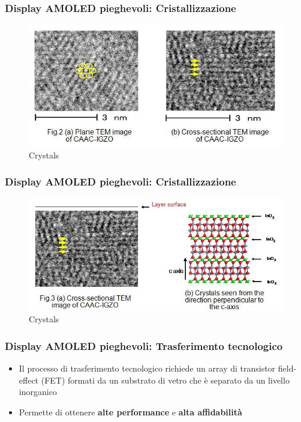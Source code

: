 \documentclass[12pt]{beamer}
\begin{document}
	\begin{frame}
		\frametitle{Display AMOLED pieghevoli: Cristallizzazione}
		\begin{figure}
			\centering
			\includegraphics[width=1\linewidth]{IMMAGINI/immagine_cristalizzazione}
			\caption{Crystals}
			\label{fig:immaginecristalizzazione}
		\end{figure}
	\end{frame}
	\begin{frame}
		\frametitle{Display AMOLED pieghevoli: Cristallizzazione}
		\begin{figure}
			\centering
			\includegraphics[width=1\linewidth]{IMMAGINI/immagine_cristalizzazione_CAAS}
			\caption{Crystals}
			\label{fig:immaginecristalizzazionecaas}
		\end{figure}
	\end{frame}
	\begin{frame}
		\frametitle{Display AMOLED pieghevoli: Trasferimento tecnologico}
		\begin{itemize}
			\item Il processo di trasferimento tecnologico richiede un array di transistor field-effect (FET) formati da un substrato di vetro che è separato da un livello inorganico
			\pause
			\item  Permette di ottenere \textbf{alte performance} e \textbf{alta affidabilità}	
		\end{itemize}
	\end{frame}
\end{document}
